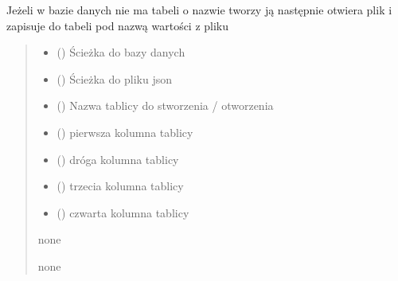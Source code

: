 \documentclass[letterpaper,10pt,polish]{sphinxmanual}
\begin{document}
\begin{fulllineitems}

\pysigstartsignatures
{}
\pysigstopsignatures
\sphinxAtStartPar
Jeżeli w bazie danych nie ma tabeli o nazwie  tworzy ją następnie otwiera plik  i zapisuje do tabeli pod nazwą  wartości z pliku
\begin{quote}\begin{description}
\begin{itemize}
\item {} 
\sphinxAtStartPar
{} () \textendash{} Ścieżka do bazy danych

\item {} 
\sphinxAtStartPar
{} () \textendash{} Ścieżka do pliku json

\item {} 
\sphinxAtStartPar
{} () \textendash{} Nazwa tablicy do stworzenia / otworzenia

\item {} 
\sphinxAtStartPar
{} () \textendash{} pierwsza kolumna tablicy

\item {} 
\sphinxAtStartPar
{} () \textendash{} dróga kolumna tablicy

\item {} 
\sphinxAtStartPar
{} () \textendash{} trzecia kolumna tablicy

\item {} 
\sphinxAtStartPar
{} () \textendash{} czwarta kolumna tablicy

\end{itemize}

\sphinxAtStartPar
none

\sphinxAtStartPar
none

\end{description}\end{quote}

\end{fulllineitems}
\end{document}
